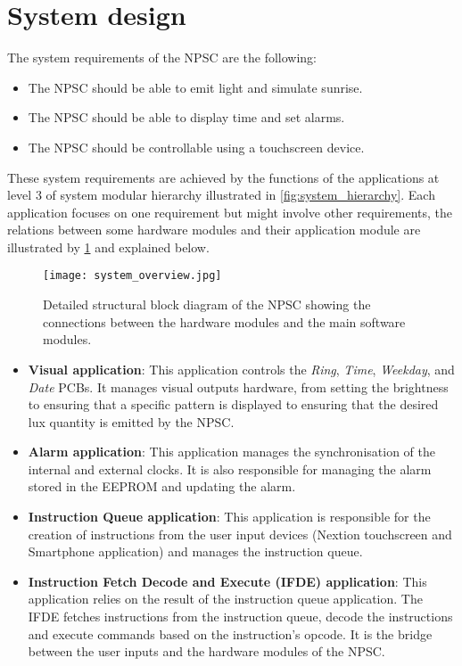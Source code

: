 \section{System design}
The system requirements of the NPSC are the following:
\begin{itemize}
\item The NPSC should be able to emit light and simulate sunrise. 
\item The NPSC should be able to display time and set alarms.
\item The NPSC should be controllable using a touchscreen device.
\end{itemize}
These system requirements are achieved by the functions of the applications at level 3 of system modular hierarchy illustrated in \cref{fig:system_hierarchy}. Each application focuses on one requirement but might involve other requirements, the relations between some hardware modules and their application module are illustrated by \cref{fig:system_overview} and explained below.
\begin{figure}[ht]
\centering
\texttt{[image: system\_overview.jpg]}
\caption{Detailed structural block diagram of the NPSC showing the connections between the hardware modules and the main software modules.}
\label{fig:system_overview}
\end{figure}
\begin{itemize}
\item \textbf{Visual application}: This application controls the \textit{Ring}, \textit{Time}, \textit{Weekday}, and \textit{Date} PCBs. It manages visual outputs hardware, from setting the brightness to ensuring that a specific pattern is displayed to ensuring that the desired lux quantity is emitted by the NPSC.
\item \textbf{Alarm application}: This application manages the synchronisation of the internal and external clocks. It is also responsible for managing the alarm stored in the EEPROM and updating the alarm.
\item \textbf{Instruction Queue application}: This application is responsible for the creation of instructions from the user input devices (Nextion touchscreen and Smartphone application) and manages the instruction queue.
\item \textbf{Instruction Fetch Decode and Execute (IFDE) application}: This application relies on the result of the instruction queue application. The IFDE fetches instructions from the instruction queue, decode the instructions and execute commands based on the instruction's opcode. It is the bridge between the user inputs and the hardware modules of the NPSC.
\end{itemize}

